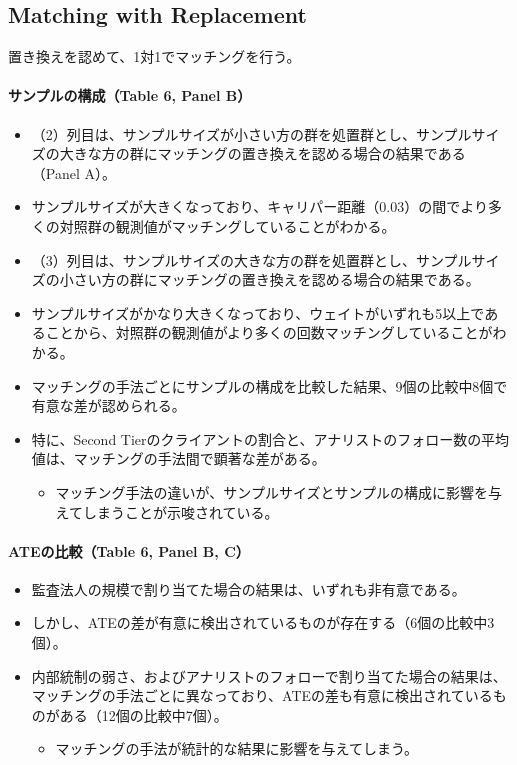 \subsection*{Matching with Replacement}

置き換えを認めて、1対1でマッチングを行う。

\paragraph{サンプルの構成（Table 6, Panel B）}

\begin{itemize}
 \item （2）列目は、サンプルサイズが小さい方の群を処置群とし、サンプルサイズの大きな方の群にマッチングの置き換えを認める場合の結果である（Panel A）。
 \item サンプルサイズが大きくなっており、キャリパー距離（0.03）の間でより多くの対照群の観測値がマッチングしていることがわかる。
 \item （3）列目は、サンプルサイズの大きな方の群を処置群とし、サンプルサイズの小さい方の群にマッチングの置き換えを認める場合の結果である。
 \item サンプルサイズがかなり大きくなっており、ウェイトがいずれも5以上であることから、対照群の観測値がより多くの回数マッチングしていることがわかる。
 \item マッチングの手法ごとにサンプルの構成を比較した結果、9個の比較中8個で有意な差が認められる。
 \item 特に、Second Tierのクライアントの割合と、アナリストのフォロー数の平均値は、マッチングの手法間で顕著な差がある。
  \begin{itemize}
   \item マッチング手法の違いが、サンプルサイズとサンプルの構成に影響を与えてしまうことが示唆されている。
  \end{itemize}
\end{itemize}

\paragraph{ATEの比較（Table 6, Panel B, C）}

\begin{itemize}
 \item 監査法人の規模で割り当てた場合の結果は、いずれも非有意である。
 \item しかし、ATEの差が有意に検出されているものが存在する（6個の比較中3個）。
 \item 内部統制の弱さ、およびアナリストのフォローで割り当てた場合の結果は、マッチングの手法ごとに異なっており、ATEの差も有意に検出されているものがある（12個の比較中7個）。
  \begin{itemize}
   \item マッチングの手法が統計的な結果に影響を与えてしまう。
  \end{itemize}
\end{itemize}

